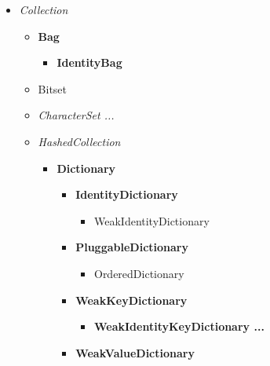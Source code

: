 \documentclass[a4paper,10pt,twoside]{book}
\begin{document}
\begin{figure}
\begin{center}
\small
{}
\begin{itemize}
\item{\emph{Collection}}
    \begin{itemize}
    \item{\textbf{Bag}}
        \begin{itemize}
        \item{\textbf{IdentityBag}}
        \end{itemize}
    \item{Bitset}
    \item{\emph{CharacterSet ...}}
    \item{\emph{HashedCollection}}
        \begin{itemize}
        \item{\textbf{Dictionary}}
            \begin{itemize}
            \item{\textbf{IdentityDictionary}}
                \begin{itemize}
                \item{WeakIdentityDictionary}
                \end{itemize}
            \item{\textbf{PluggableDictionary}}
                \begin{itemize}
                \item{OrderedDictionary}
                \end{itemize}
            \item{\textbf{WeakKeyDictionary}}
                \begin{itemize}
                \item{\textbf{WeakIdentityKeyDictionary ...}}
                \end{itemize}
            \item{\textbf{WeakValueDictionary}}
            \end{itemize}

\end{itemize}
\end{itemize}
\end{itemize}
\end{center}
\end{figure}
\end{document}
